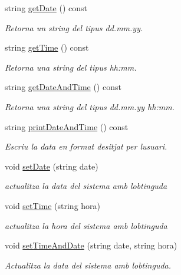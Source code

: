 \begin{DoxyCompactItemize}
\item 
string \hyperlink{class_rellotge_addfca1622b9aeba2cdff685060871153}{get\+Date} () const 
\begin{DoxyCompactList}\small\item\em Retorna un string del tipus dd.\+mm.\+yy. \end{DoxyCompactList}\item 
string \hyperlink{class_rellotge_af7a5cf18e7903db9fbaffe526fcf5a06}{get\+Time} () const 
\begin{DoxyCompactList}\small\item\em Retorna una string del tipus hh\+:mm. \end{DoxyCompactList}\item 
string \hyperlink{class_rellotge_a2ee21b1a870f7ca670e54cadeb0ee62d}{get\+Date\+And\+Time} () const 
\begin{DoxyCompactList}\small\item\em Retorna una string del tipus dd.\+mm.\+yy hh\+:mm. \end{DoxyCompactList}\item 
string \hyperlink{class_rellotge_abe2b43818a3c3283d499a4070efa6c7f}{print\+Date\+And\+Time} () const 
\begin{DoxyCompactList}\small\item\em Escriu la data en format desitjat per l\textquotesingle{}usuari. \end{DoxyCompactList}\item 
void \hyperlink{class_rellotge_a19fc5ccb1b3949979f03f207f877c059}{set\+Date} (string date)
\begin{DoxyCompactList}\small\item\em actualitza la data del sistema amb l\textquotesingle{}obtinguda \end{DoxyCompactList}\item 
void \hyperlink{class_rellotge_a8b4ddc7c6b02397c415a2f0ca815dc04}{set\+Time} (string hora)
\begin{DoxyCompactList}\small\item\em actualitza la hora del sistema amb l\textquotesingle{}obtinguda \end{DoxyCompactList}\item 
void \hyperlink{class_rellotge_a418c7be8bf66f6e27291d6b77dcd969f}{set\+Time\+And\+Date} (string date, string hora)
\begin{DoxyCompactList}\small\item\em Actualitza la data del sistema amb l\textquotesingle{}obtinguda. \end{DoxyCompactList}\item 

\end{DoxyCompactItemize}
